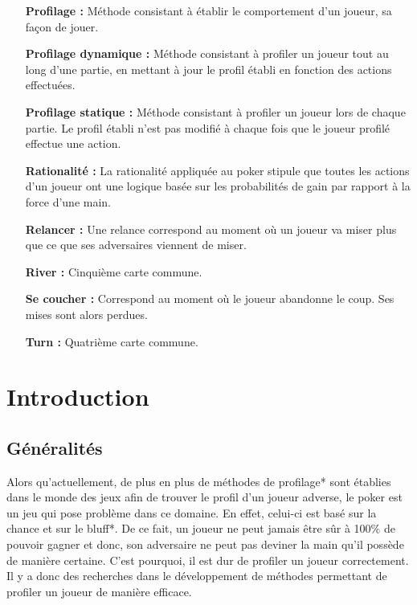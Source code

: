 \documentclass{report}
\begin{document}
\begin{itemize}
		\item[\textbf{Profilage : }]	Méthode consistant à établir le comportement d'un joueur, sa façon de jouer.
		
		\item[\textbf{Profilage dynamique : }]Méthode consistant à profiler un joueur tout au long d'une partie, en mettant à jour le profil établi en fonction des actions effectuées.\medskip
		
		\item[\textbf{Profilage statique : }]Méthode consistant à profiler un joueur lors de chaque partie. Le profil établi n'est pas modifié à chaque fois que le joueur profilé effectue une action.\medskip

		\item[\textbf{Rationalité : }]La rationalité  appliquée au poker stipule que toutes les actions d'un joueur ont une logique basée sur les probabilités de gain par rapport à la force d'une main.\medskip

		\item[\textbf{Relancer : }]Une relance correspond au moment où un joueur va miser plus que ce que ses adversaires viennent de miser.\medskip
		
		\item[\textbf{River : }]Cinquième carte commune.\medskip
		
		\item[\textbf{Se coucher : }]Correspond au moment où le joueur abandonne le coup. Ses mises sont alors perdues.\medskip

		\item[\textbf{Turn : }]Quatrième carte commune.\medskip
		
		
		

		
\end{itemize}



\chapter{Introduction}

\section{Généralités}
\hspace{0.5cm}Alors qu'actuellement, de plus en plus de méthodes de profilage* sont établies dans le monde des jeux afin de trouver le profil d'un joueur adverse, le poker est un jeu qui pose problème dans ce domaine. En effet, celui-ci est basé sur la chance et sur le bluff*. De ce fait, un joueur ne peut jamais être sûr à 100\% de pouvoir gagner et donc, son adversaire ne peut pas deviner la main qu'il possède de manière certaine. C'est pourquoi, il est dur de profiler un joueur correctement. Il y a donc des recherches dans le développement de méthodes permettant de profiler un joueur de manière efficace. \par
\end{document}
